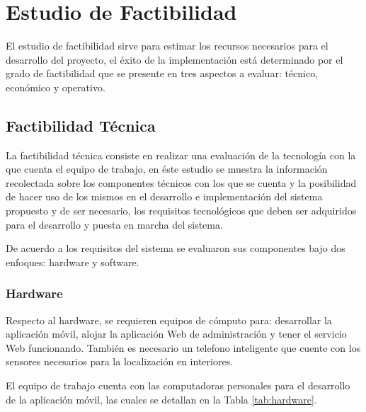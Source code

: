 \section{Estudio de Factibilidad}

\newcommand{\tabitem}{~~\llap{\textbullet}~~}

El estudio de factibilidad sirve para estimar los recursos necesarios para el desarrollo del proyecto, el éxito de la implementación está determinado por el grado de factibilidad que se presente en tres aspectos a evaluar: técnico, económico y operativo.

\subsection{Factibilidad Técnica}

La factibilidad técnica consiste en realizar una evaluación de la tecnología con la que cuenta el equipo de trabajo, en éste estudio se muestra la información recolectada sobre los componentes técnicos con los que se cuenta y la posibilidad de hacer uso de los mismos en el desarrollo e implementación del sistema propuesto y de ser necesario, los requisitos tecnológicos que deben ser adquiridos para el desarrollo y puesta en marcha del sistema. 

De acuerdo a los requisitos del sistema se evaluaron sus componentes bajo dos enfoques: hardware y software. 

\subsubsection{Hardware}

Respecto al hardware, se requieren equipos de cómputo para: desarrollar la aplicación móvil, alojar la aplicación Web de administración y tener el servicio Web funcionando. También es necesario un telefono inteligente que cuente con los sensores necesarios para la localización en interiores. 

El equipo de trabajo cuenta con las computadoras personales para el desarrollo de la aplicación móvil, las cuales se detallan en la Tabla \ref{tab:hardware}.

